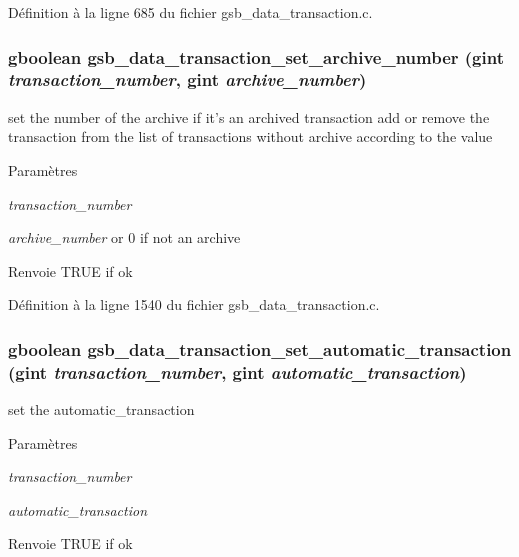 Définition à la ligne 685 du fichier gsb\_\-data\_\-transaction.c.

\subsubsection[{gsb\_\-data\_\-transaction\_\-set\_\-archive\_\-number}]{\setlength{\rightskip}{0pt plus 5cm}gboolean gsb\_\-data\_\-transaction\_\-set\_\-archive\_\-number (gint {\em transaction\_\-number}, \/  gint {\em archive\_\-number})}\label{gsb__data__transaction_8h_adc4e030e27ded40c7fde043e91ca8811}
set the number of the archive if it's an archived transaction add or remove the transaction from the list of transactions without archive according to the value


\begin{DoxyParams}{Paramètres}
\item[{\em transaction\_\-number}]\item[{\em archive\_\-number}]or 0 if not an archive\end{DoxyParams}
\begin{DoxyReturn}{Renvoie}
TRUE if ok 
\end{DoxyReturn}


Définition à la ligne 1540 du fichier gsb\_\-data\_\-transaction.c.

\subsubsection[{gsb\_\-data\_\-transaction\_\-set\_\-automatic\_\-transaction}]{\setlength{\rightskip}{0pt plus 5cm}gboolean gsb\_\-data\_\-transaction\_\-set\_\-automatic\_\-transaction (gint {\em transaction\_\-number}, \/  gint {\em automatic\_\-transaction})}\label{gsb__data__transaction_8h_a6211d83ecff1be17883d8cc6427a19aa}
set the automatic\_\-transaction 
\begin{DoxyParams}{Paramètres}
\item[{\em transaction\_\-number}]\item[{\em automatic\_\-transaction}]\end{DoxyParams}
\begin{DoxyReturn}{Renvoie}
TRUE if ok 
\end{DoxyReturn}


